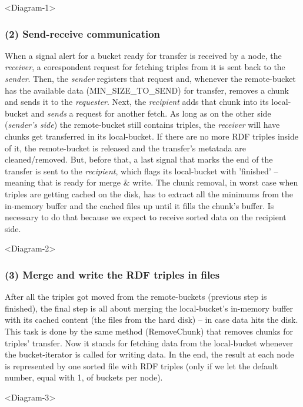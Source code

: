 <Diagram-1>

% 
\subsubsection*{(2) Send-receive communication}

When a signal alert for a bucket ready for transfer is received by a node, the \textit{receiver}, a corespondent request for fetching triples from it is sent back to the \textit{sender}. Then, the \textit{sender} registers that request and, whenever the remote-bucket has the available data (MIN\_SIZE\_TO\_SEND) for transfer, removes a chunk and sends it to the \textit{requester}. Next, the \textit{recipient} adds that chunk into its local-bucket and \textit{sends} a request for another fetch. As long as on the other side (\textit{sender's side}) the remote-bucket still contains triples, the \textit{receiver} will have chunks get transferred in its local-bucket. If there are no more RDF triples inside of it, the remote-bucket is released and the transfer's metatada are cleaned/removed. But, before that, a last signal that marks the end of the transfer is sent to the \textit{recipient}, which flags its local-bucket with 'finished' -- meaning that is ready for merge \& write. The chunk removal, in worst case when triples are getting cached on the disk, has to extract all the minimums from the in-memory buffer and the cached files up until it fills the chunk's buffer. Is necessary to do that because we expect to receive sorted data on the recipient side.

<Diagram-2>

% 
\subsubsection*{(3) Merge and write the RDF triples in files}

After all the triples got moved from the remote-buckets (previous step is finished), the final step is all about merging the local-bucket's in-memory buffer with its cached content (the files from the hard disk) -- in case data hits the disk. This task is done by the same method (RemoveChunk) that removes chunks for triples' transfer. Now it stands for fetching data from the local-bucket whenever the bucket-iterator is called for writing data. In the end, the result at each node is represented by one sorted file with RDF triples (only if we let the default number, equal with 1, of buckets per node).

<Diagram-3>


